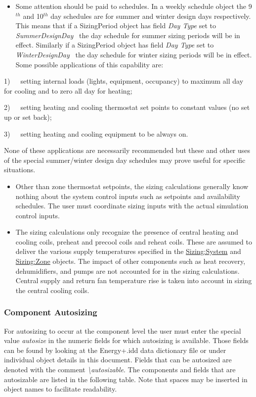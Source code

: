 \begin{itemize}
\item
  Some attention should be paid to schedules. In a weekly schedule object the 9\(^{th}\) and 10\(^{th}\) day schedules are for summer and winter design days respectively. This means that if a SizingPeriod object has field \emph{Day Type} set to \emph{SummerDesignDay} ~the day schedule for summer sizing periods will be in effect. Similarly if a SizingPeriod object has field \emph{Day Type} set to \emph{WinterDesignDay} ~the day schedule for winter sizing periods will be in effect. Some possible applications of this capability are:
\end{itemize}

1)~~~setting internal loads (lights, equipment, occupancy) to maximum all day for cooling and to zero all day for heating;

2)~~~setting heating and cooling thermostat set points to constant values (no set up or set back);

3)~~~setting heating and cooling equipment to be always on.

None of these applications are necessarily recommended but these and other uses of the special summer/winter design day schedules may prove useful for specific situations.

\begin{itemize}
\item
  Other than zone thermostat setpoints, the sizing calculations generally know nothing about the system control inputs such as setpoints and availability schedules. The user must coordinate sizing inputs with the actual simulation control inputs.
\item
  The sizing calculations only recognize the presence of central heating and cooling coils, preheat and precool coils and reheat coils. These are assumed to deliver the various supply temperatures specified in the \hyperref[sizingsystem]{Sizing:System} and \hyperref[sizingzone]{Sizing:Zone} objects. The impact of other components such as heat recovery, dehumidifiers, and pumps are not accounted for in the sizing calculations. Central supply and return fan temperature rise is taken into account in sizing the central cooling coils.
\end{itemize}

\subsubsection{Component Autosizing}\label{component-autosizing}

For autosizing to occur at the component level the user must enter the special value \emph{autosize} in the numeric fields for which autosizing is available. Those fields can be found by looking at the Energy+.idd data dictionary file or under individual object details in this document. Fields that can be autosized are denoted with the comment \emph{\textbackslash{}autosizable}. The components and fields that are autosizable are listed in the following table. Note that spaces may be inserted in object names to facilitate readability.

